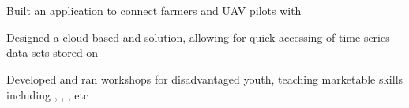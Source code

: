 \documentclass[]{hackathons}
\begin{document}
\begin{minipage}[t]{0.64\textwidth}
\section{}
\begin{tightemize}
\item Built an application to connect farmers and UAV pilots with 
\item Designed a cloud-based  and  solution, allowing for quick accessing of time-series data sets stored on 
\end{tightemize}
\medskip

\begin{tightemize}
\item Developed and ran workshops for disadvantaged youth, teaching marketable skills including , , , etc
\end{tightemize}


%
%

\end{minipage} 
\hfill
\end{document}
